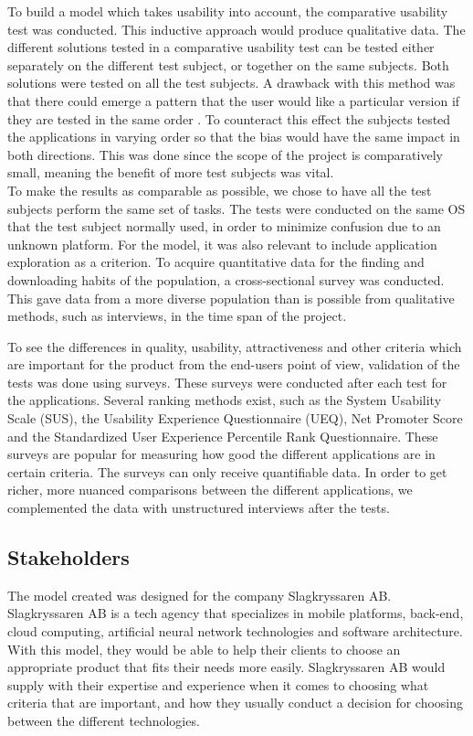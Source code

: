 To build a model which takes usability into account, the comparative usability test was conducted. This inductive approach would produce qualitative data. The different solutions tested in a comparative usability test can be tested either separately on the different test subject, or together on the same subjects. Both solutions were tested on all the test subjects. A drawback with this method was that there could emerge a pattern that the user would like a particular version if they are tested in the same order \cite{Ross2017}. To counteract this effect the subjects tested the applications in varying order so that the bias would have the same impact in both directions. This was done since the scope of the project is comparatively small, meaning the benefit of more test subjects was vital. \\
To make the results as comparable as possible, we chose to have all the test subjects perform the same set of tasks. The tests were conducted on the same OS that the test subject normally used, in order to minimize confusion due to an unknown platform. 
For the model, it was also relevant to include application exploration as a criterion. To acquire quantitative data for the finding and downloading habits of the population, a cross-sectional survey was conducted. This gave data from a more diverse population than is possible from qualitative methods, such as interviews, in the time span of the project. 

To see the differences in quality, usability, attractiveness and other criteria which are important for the product from the end-users point of view, validation of the tests was done using surveys. These surveys were conducted after each test for the applications. Several ranking methods exist, such as the System Usability Scale (SUS), the Usability Experience Questionnaire (UEQ), Net Promoter Score and the Standardized User Experience Percentile Rank Questionnaire. These surveys are popular for measuring how good the different applications are in certain criteria\cite{Rauschenberger2013, Kortum2014}. The surveys can only receive quantifiable data. In order to get richer, more nuanced comparisons between the different applications, we complemented the data with unstructured interviews after the tests.

\subsection{Stakeholders}

The model created was designed for the company Slagkryssaren AB. \\
Slagkryssaren AB is a tech agency that specializes in mobile platforms, back-end, cloud computing, artificial neural network technologies and software architecture. With this model, they would be able to help their clients to choose an appropriate product that fits their needs more easily. Slagkryssaren AB would supply with their expertise and experience when it comes to choosing what criteria that are important, and how they usually conduct a decision for choosing between the different technologies.

